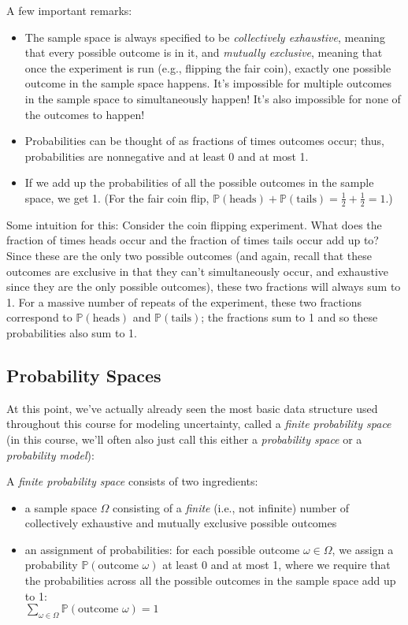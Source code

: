\documentclass[6008notes.tex]{subfiles}
\begin{document}
A few important remarks:
\begin{itemize}
\item The sample space is always specified to be \textit{collectively exhaustive}, meaning that every possible outcome is in it, and \textit{mutually exclusive}, meaning that once the experiment is run (e.g., flipping the fair coin), exactly one possible outcome in the sample space happens. It's impossible for multiple outcomes in the sample space to simultaneously happen! It's also impossible for none of the outcomes to happen!

\item Probabilities can be thought of as fractions of times outcomes occur; thus, probabilities are nonnegative and at least 0 and at most 1.

\item If we add up the probabilities of all the possible outcomes in the sample space, we get 1.
(For the fair coin flip, $\mathbb {P}(\text {heads})+\mathbb {P}(\text {tails})=\frac{1}{2}+\frac{1}{2}=1$.)
\end{itemize}

Some intuition for this: Consider the coin flipping experiment. What does the fraction of times heads occur and the fraction of times tails occur add up to? Since these are the only two possible outcomes (and again, recall that these outcomes are exclusive in that they can't simultaneously occur, and exhaustive since they are the only possible outcomes), these two fractions will always sum to 1. For a massive number of repeats of the experiment, these two fractions correspond to $\mathbb {P}(\text {heads})$ and $\mathbb {P}(\text {tails})$; the fractions sum to 1 and so these probabilities also sum to 1.

\subsection{Probability Spaces}

At this point, we've actually already seen the most basic data structure used throughout this course for modeling uncertainty, called a \textit{finite probability space} (in this course, we'll often also just call this either a \textit{probability space} or a \textit{probability model}):

A \textit{finite probability space} consists of two ingredients:
\begin{itemize}
 \item a sample space $\Omega$ consisting of a \textit{finite} (i.e., not infinite) number of collectively exhaustive and mutually exclusive possible outcomes

\item an assignment of probabilities: for each possible outcome $\omega \in \Omega$, we assign a probability $\mathbb {P}(\text {outcome }\omega )$ at least 0 and at most 1, where we require that the probabilities across all the possible outcomes in the sample space add up to 1:\\
$\sum _{\omega \in \Omega }\mathbb {P}(\text {outcome }\omega )=1$
\end{itemize}
\end{document}
